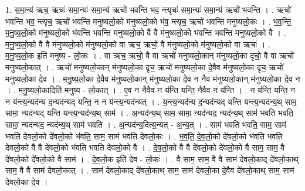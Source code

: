 \documentclass[17pt]{extarticle}
\begin{document}
1. स॒मा॒न्य॑ ऋच॒ ऋचः॑ समा॒न्यः॑ समा॒न्य॑ ऋचो॑ भवन्ति भव॒ न्त्यृचः॑ समा॒न्यः॑ समा॒न्य॑ ऋचो॑ भवन्ति । . ऋचो॑ भवन्ति भव॒ न्त्यृच॒ ऋचो॑ भवन्ति मनुष्यलो॒को म॑नुष्यलो॒को भ॑व॒ न्त्यृच॒ ऋचो॑ भवन्ति मनुष्यलो॒कः । . भ॒व॒न्ति॒ म॒नु॒ष्य॒लो॒को म॑नुष्यलो॒को भ॑वन्ति भवन्ति मनुष्यलो॒को वै वै म॑नुष्यलो॒को भ॑वन्ति भवन्ति मनुष्यलो॒को वै । . म॒नु॒ष्य॒लो॒को वै वै म॑नुष्यलो॒को म॑नुष्यलो॒को वा ऋच॒ ऋचो॒ वै म॑नुष्यलो॒को म॑नुष्यलो॒को वा ऋचः॑ । . म॒नु॒ष्य॒लो॒क इति॑ मनुष्य - लो॒कः । . वा ऋच॒ ऋचो॒ वै वा ऋचो॑ मनुष्यलो॒कान् म॑नुष्यलो॒का दृचो॒ वै वा ऋचो॑ मनुष्यलो॒कात् । . ऋचो॑ मनुष्यलो॒कान् म॑नुष्यलो॒का दृच॒ ऋचो॑ मनुष्यलो॒का दे॒वैव म॑नुष्यलो॒का दृच॒ ऋचो॑ मनुष्यलो॒का दे॒व । . म॒नु॒ष्य॒लो॒का दे॒वैव म॑नुष्यलो॒कान् म॑नुष्यलो॒का दे॒व न नैव म॑नुष्यलो॒कान् म॑नुष्यलो॒का दे॒व न । . म॒नु॒ष्य॒लो॒कादिति॑ मनुष्य - लो॒कात् । . ए॒व न नैवैव न य॑न्ति यन्ति॒ नैवैव न य॑न्ति । . न य॑न्ति यन्ति॒ न न य॑न्त्य॒न्यद॑न्य द॒न्यद॑न्यद् यन्ति॒ न न य॑न्त्य॒न्यद॑न्यत् । . य॒न्त्य॒न्यद॑न्य द॒न्यद॑न्यद् यन्ति यन्त्य॒न्यद॑न्य॒थ् साम॒ सामा॒ न्यद॑न्यद् यन्ति यन्त्य॒न्यद॑न्य॒थ् साम॑ । . अ॒न्यद॑न्य॒थ् साम॒ सामा॒ न्यद॑न्यद॒ न्यद॑न्य॒थ् साम॑ भवति भवति॒ सामा॒ न्यद॑न्यद॒ न्यद॑न्य॒थ् साम॑ भवति । . अ॒न्यद॑न्य॒दित्य॒न्यत् - अ॒न्य॒त् । . साम॑ भवति भवति॒ साम॒ साम॑ भवति देवलो॒को दे॑वलो॒को भ॑वति॒ साम॒ साम॑ भवति देवलो॒कः । . भ॒व॒ति॒ दे॒व॒लो॒को दे॑वलो॒को भ॑वति भवति देवलो॒को वै वै दे॑वलो॒को भ॑वति भवति देवलो॒को वै । . दे॒व॒लो॒को वै वै दे॑वलो॒को दे॑वलो॒को वै साम॒ साम॒ वै दे॑वलो॒को दे॑वलो॒को वै साम॑ । . दे॒व॒लो॒क इति॑ देव - लो॒कः । . वै साम॒ साम॒ वै वै साम॑ देवलो॒काद् दे॑वलो॒काथ् साम॒ वै वै साम॑ देवलो॒कात् । . साम॑ देवलो॒काद् दे॑वलो॒काथ् साम॒ साम॑ देवलो॒का दे॒वैव दे॑वलो॒काथ् साम॒ साम॑ देवलो॒का दे॒व । \newline
\end{document}

